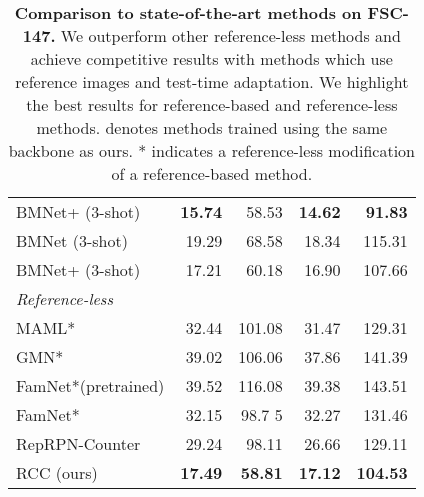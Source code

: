 \documentclass[letterpaper, 11pt]{IEEEtran}
\begin{document}
\begin{table}
\begin{tabular}{lrrrr}
BMNet+  \cite{shi2022represent} \hfill (3-shot) 
& \textbf{15.74} & 58.53 & \textbf{14.62} & \textbf{91.83} \\
BMNet 
 \cite{shi2022represent} \hfill (3-shot) 
& 19.29  & 68.58 & 18.34  & 115.31  \\
BMNet+  
 \cite{shi2022represent} \hfill (3-shot) 
& 17.21 & 60.18 & 16.90 & 107.66  \\
\midrule
\textit{Reference-less} & & & & \\
MAML* 
\cite{finn2017model}
& 32.44 & 101.08 & 31.47 & 129.31 \\
GMN* 
\cite{Lu18}
& 39.02 & 106.06& 37.86& 141.39 \\
 FamNet*(pretrained) 
 \cite{ranjan2021Famnet}
 & 39.52 & 116.08 & 39.38 & 143.51 \\
FamNet*
\cite{ranjan2021Famnet}
& 32.15 & 98.7 5& 32.27 & 131.46 \\
 RepRPN-Counter 
 \cite{ranjan2022exemplar}
 & 29.24 & 98.11 & 26.66 & 129.11 \\
RCC (ours) & \textbf{17.49}  & \textbf{58.81} & \textbf{17.12}  & \textbf{104.53} \\
\bottomrule
\end{tabular}
     \caption{\textbf{Comparison to state-of-the-art methods on FSC-147.} We outperform other reference-less methods and achieve competitive results with methods which use reference images and test-time adaptation. We highlight the best results for reference-based and reference-less methods.  denotes methods trained using the same backbone as ours. 
    * indicates a reference-less modification of a reference-based method.
    }
    \label{FSC147_results_table}
\end{table}
\end{document}
